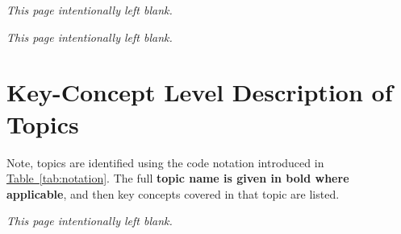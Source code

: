 \documentclass[twoside,12pt,a4paper]{report}
\makeatletter
\newcommand*{\intentionallyblankpage}{
  \vspace*{\fill}
  {\centering \textit{This page intentionally left blank.} \par}
  \vspace{\fill}}
\renewcommand*{\cleardoublepage}{\clearpage\if@twoside \ifodd\c@page\else
  \intentionallyblankpage
  \newpage
  \if@twocolumn\hbox{}\newpage\fi\fi\fi}
\newcommand{\reftab}[1]{\hyperref[tab:#1]{Table~\ref{tab:#1}}}
\makeatother
\begin{document}
\cleardoublepage
\begin{appendices}

\cleardoublepage
\chapter{Key-Concept Level Description of Topics}
\label{app:concepts}

Note, topics are identified using the code notation introduced in \reftab{notation}. The full \textbf{topic name is given in bold where applicable}, and then key concepts covered in that topic are listed.



\end{appendices}

\glsresetall
\cleardoublepage

 
\end{document}
